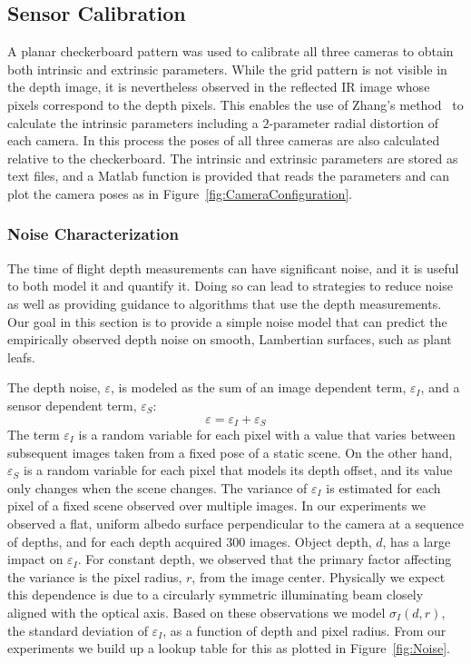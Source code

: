 

\subsection{Sensor Calibration}

A planar checkerboard pattern was used to calibrate all three cameras to obtain both intrinsic and extrinsic parameters. While the grid pattern is not visible in the depth image, it is nevertheless observed in the reflected IR image whose pixels correspond to the depth pixels. This enables the use of Zhang's method~\cite{Zhang2000} to calculate the intrinsic parameters including a $2$-parameter radial distortion of each camera. In this process the poses of all three cameras are also calculated relative to the checkerboard. The intrinsic and extrinsic parameters are stored as text files, and a Matlab function is provided that reads the parameters and can plot the camera poses as in Figure~\ref{fig:CameraConfiguration}.


\subsubsection{Noise Characterization}
\label{sec:bias}

The time of flight depth measurements can have significant noise, and it is useful to both model it and quantify it. Doing so can lead to strategies to reduce noise as well as providing guidance to algorithms that use the depth measurements. Our goal in this section is to provide a simple noise model that can predict the empirically observed depth noise on smooth, Lambertian surfaces, such as plant leafs.

The depth noise, $\varepsilon$, is modeled as the sum of an image dependent term, $\varepsilon_I$, and a sensor dependent term, $\varepsilon_S$:
\begin{equation}
\varepsilon = \varepsilon_I + \varepsilon_S\label{eq:epsilon}
\end{equation}
The term $\varepsilon_I$ is a random variable for each pixel with a value that varies between subsequent images taken from a fixed pose of a static scene.  On the other hand, $\varepsilon_S$ is a random variable for each pixel that models its depth offset, and its value only changes when the scene changes.  The variance of $\varepsilon_I$ is estimated for each pixel of a fixed scene observed over multiple images. In our experiments we observed a flat, uniform albedo surface perpendicular to the camera at a sequence of depths, and for each depth acquired 300 images. Object depth, $d$, has a large impact on $\varepsilon_I$. For constant depth, we observed that the primary factor affecting the variance is the pixel radius, $r$, from the image center. Physically we expect this dependence is due to a circularly symmetric illuminating beam closely aligned with the optical axis. Based on these observations we model $\sigma_I(d,r)$, the standard deviation of $\varepsilon_I$, as a function of depth and pixel radius.  From our experiments we build up a lookup table for this as plotted in Figure~\ref{fig:Noise}.

